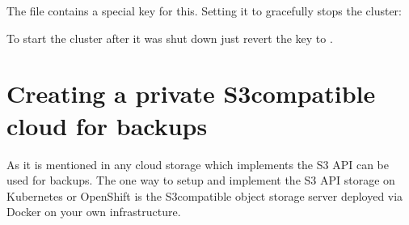 \documentclass[letterpaper,10pt,english]{sphinxmanual}
\begin{document}
The  file contains a special  key for this.
Setting it to  gracefully stops the cluster:

\begin{sphinxVerbatim}[commandchars=\\\{\}]
   
\end{sphinxVerbatim}

To start the cluster after it was shut down just revert the  key
to .


\chapter{Creating a private S3\sphinxhyphen{}compatible cloud for backups}
\label{\detokenize{private:creating-a-private-s3-compatible-cloud-for-backups}}\label{\detokenize{private::doc}}
As it is mentioned in
any cloud storage which implements the S3 API can be used for backups. The one way to setup and implement the S3 API storage on Kubernetes or OpenShift is
 \sphinxhyphen{} the S3\sphinxhyphen{}compatible object storage
server deployed via Docker on your own infrastructure.
\end{document}
